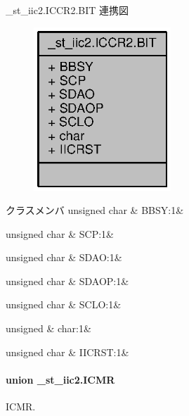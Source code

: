 \+\_\+st\+\_\+iic2.\+I\+C\+C\+R2.\+B\+I\+T 連携図
\nopagebreak
\begin{figure}[H]
\begin{center}
\leavevmode
\includegraphics[width=146pt]{d8/d46/struct__st__iic2_8ICCR2_8BIT__coll__graph}
\end{center}
\end{figure}
\begin{DoxyFields}{クラスメンバ}
unsigned char\label{3694s_8h_ac8d9db8395ca1aad32f771916652c643}
&
B\+B\+S\+Y\+:1&
\\
\hline

unsigned char\label{3694s_8h_a1bd0d9136d72f7d983f64e8bd077e423}
&
S\+C\+P\+:1&
\\
\hline

unsigned char\label{3694s_8h_a7040c4e79832ca8429eaaac97864ddb7}
&
S\+D\+A\+O\+:1&
\\
\hline

unsigned char\label{3694s_8h_ab85b2eec5a273fae299f61a46df638ad}
&
S\+D\+A\+O\+P\+:1&
\\
\hline

unsigned char\label{3694s_8h_a5be947067f5c16f7ab845983874b9aec}
&
S\+C\+L\+O\+:1&
\\
\hline

unsigned\label{3694s_8h_aa87deb01c5f539e6bda34829c8ef2368}
&
char\+:1&
\\
\hline

unsigned char\label{3694s_8h_aa095d0286b0562bbea24b1d5674e04ba}
&
I\+I\+C\+R\+S\+T\+:1&
\\
\hline

\end{DoxyFields}
\label{union__st__iic2_8ICMR}
\paragraph{union \+\_\+st\+\_\+iic2.\+I\+C\+M\+R}
I\+C\+M\+R. 

